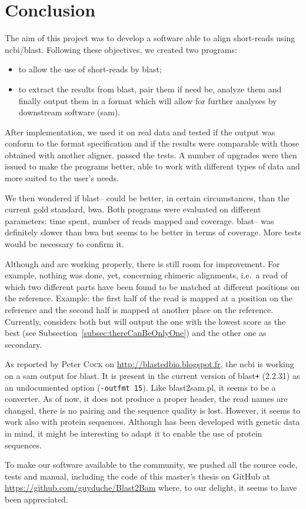 \chapter{Conclusion}\label{ch:conclusion}
The aim of this project was to develop a software able to align short-reads using \gls{ncbi}\slash\gls{blast}.
Following these objectives, we created two programs:
\begin{itemize}
    \item \fastqtofasta{} to allow the use of short-reads by \gls{blast};
    \item \blastobam{} to extract the results from \gls{blast}, pair them if need be, analyze them and finally output them in a format which will allow for further analyses by downstream software (\gls{sam}).
\end{itemize}

After implementation, we used it on real data and tested if the output was conform to the format specification and if the results were comparable with those obtained with another aligner.
\blastobam{} passed the tests.
A number of upgrades were then issued to make the programs better, able to work with different types of data and more suited to the user's needs.

We then wondered if \gls{blast}--\blastobam{} could be better, in certain circumstances, than the current gold standard, \gls{bwa}.
Both programs were evaluated on different parameters: time spent, number of reads mapped and coverage.
\gls{blast}--\blastobam{} was definitely slower than \gls{bwa} but seems to be better in terms of coverage.
More tests would be necessary to confirm it.

Although \fastqtofasta{} and \blastobam{} are working properly, there is still room for improvement.
For example, nothing was done, yet, concerning chimeric alignments, i.e.~a read of which two different parts have been found to be matched at different positions on the reference.
Example: the first half of the read is mapped at a position on the reference and the second half is mapped at another place on the reference.
Currently, \blastobam{} considers both but will output the one with the lowest score as the best (see Subsection~\ref{subsec:thereCanBeOnlyOne}) and the other one as secondary.

As reported by Peter \textsc{Cock} on \href{http://blastedbio.blogspot.fr/2015/07/ncbi-working-on-sam-output-from-blast.html}{http://blastedbio.blogspot.fr}, the \gls{ncbi} is working on a \gls{sam} output for \gls{blast}. It is present in the current version of \gls{blast}\texttt{+} (2.2.31) as an undocumented option (\texttt{-outfmt 15}).
Like blast2sam.pl, it seems to be a converter. As of now, it does not produce a proper header, the read names are changed, there is no pairing and the sequence quality is lost.
However, it seems to work also with protein sequences.
Although \blastobam{} has been developed with genetic data in mind, it might be interesting to adapt it to enable the use of protein sequences.

To make our software available to the community, we pushed all the source code, tests and manual, including the code of this master's thesis on GitHub at \url{https://github.com/guyduche/Blast2Bam} where, to our delight, it seems to have been appreciated.
